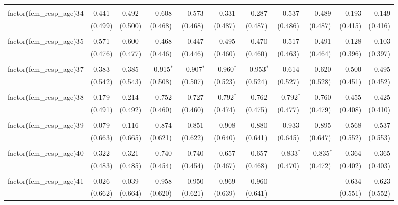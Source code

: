 \begin{table}[!htbp]
\begin{tabular}{@{\extracolsep{5pt}}lcccccccccc}
  & & & & & & & & & & \\ 
 factor(fem\_resp\_age)34 & 0.441 & 0.492 & $-$0.608 & $-$0.573 & $-$0.331 & $-$0.287 & $-$0.537 & $-$0.489 & $-$0.193 & $-$0.149 \\ 
  & (0.499) & (0.500) & (0.468) & (0.468) & (0.487) & (0.487) & (0.486) & (0.487) & (0.415) & (0.416) \\ 
  & & & & & & & & & & \\ 
 factor(fem\_resp\_age)35 & 0.571 & 0.600 & $-$0.468 & $-$0.447 & $-$0.495 & $-$0.470 & $-$0.517 & $-$0.491 & $-$0.128 & $-$0.103 \\ 
  & (0.476) & (0.477) & (0.446) & (0.446) & (0.460) & (0.460) & (0.463) & (0.464) & (0.396) & (0.397) \\ 
  & & & & & & & & & & \\ 
 factor(fem\_resp\_age)37 & 0.383 & 0.385 & $-$0.915$^{*}$ & $-$0.907$^{*}$ & $-$0.960$^{*}$ & $-$0.953$^{*}$ & $-$0.614 & $-$0.620 & $-$0.500 & $-$0.495 \\ 
  & (0.542) & (0.543) & (0.508) & (0.507) & (0.523) & (0.524) & (0.527) & (0.528) & (0.451) & (0.452) \\ 
  & & & & & & & & & & \\ 
 factor(fem\_resp\_age)38 & 0.179 & 0.214 & $-$0.752 & $-$0.727 & $-$0.792$^{*}$ & $-$0.762 & $-$0.792$^{*}$ & $-$0.760 & $-$0.455 & $-$0.425 \\ 
  & (0.491) & (0.492) & (0.460) & (0.460) & (0.474) & (0.475) & (0.477) & (0.479) & (0.408) & (0.410) \\ 
  & & & & & & & & & & \\ 
 factor(fem\_resp\_age)39 & 0.079 & 0.116 & $-$0.874 & $-$0.851 & $-$0.908 & $-$0.880 & $-$0.933 & $-$0.895 & $-$0.568 & $-$0.537 \\ 
  & (0.663) & (0.665) & (0.621) & (0.622) & (0.640) & (0.641) & (0.645) & (0.647) & (0.552) & (0.553) \\ 
  & & & & & & & & & & \\ 
 factor(fem\_resp\_age)40 & 0.322 & 0.321 & $-$0.740 & $-$0.740 & $-$0.657 & $-$0.657 & $-$0.833$^{*}$ & $-$0.835$^{*}$ & $-$0.364 & $-$0.365 \\ 
  & (0.483) & (0.485) & (0.454) & (0.454) & (0.467) & (0.468) & (0.470) & (0.472) & (0.402) & (0.403) \\ 
  & & & & & & & & & & \\ 
 factor(fem\_resp\_age)41 & 0.026 & 0.039 & $-$0.958 & $-$0.950 & $-$0.969 & $-$0.960 &  &  & $-$0.634 & $-$0.623 \\ 
  & (0.662) & (0.664) & (0.620) & (0.621) & (0.639) & (0.641) &  &  & (0.551) & (0.552) \\ 

\end{tabular}
\end{table}
